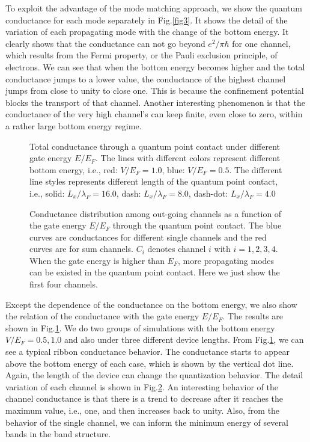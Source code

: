 \documentclass[journal]{IEEEtran}
\begin{document}
To exploit the advantage of the mode matching approach, we show the quantum conductance for each mode separately in
Fig.\ref{fig3}. It shows the detail of the variation of each propagating mode with the change of the bottom energy. It
clearly shows that the conductance can not go beyond $e^2/\pi\hbar$ for one channel, which results from the Fermi
property, or the Pauli exclusion principle, of electrons. We can see that when the bottom energy becomes higher and the
total conductance jumps to a lower value, the conductance of the highest channel jumps from close to unity to close one.
This is because the confinement potential blocks the transport of that channel. Another interesting phenomenon is that
the conductance of the very high channel's can keep finite, even close to zero, within a rather large bottom energy
regime.
\begin{figure}
    \centering
    \caption{Total conductance through a quantum point contact under different gate energy $E/E_F$. The lines with
    different colors represent different bottom energy, i.e., red: $V/E_F=1.0$, blue: $V/E_F=0.5$.  The different line
styles represents different length of the quantum point contact, i.e., solid: $L_x/\lambda_F=16.0$, dash:
$L_x/\lambda_F=8.0$, dash-dot: $L_x/\lambda_F=4.0$} \label{fig4}
\end{figure}
\begin{figure}
    \centering
    \caption{Conductance distribution among out-going channels as a function of the gate energy $E/E_F$ through the
    quantum point contact. The blue curves are conductances for different single channels and the red curves are for sum
channels. $C_i$ denotes channel $i$ with $i=1,2,3,4$. When the gate energy is higher than $E_F$, more propagating modes
can be existed in the quantum point contact. Here we just show the first four channels.}
    \label{fig5}
\end{figure}

Except the dependence of the conductance on the bottom energy, we also show the relation of the conductance with the
gate energy $E/E_F$. The results are shown in Fig.\ref{fig4}. We do two groups of simulations with the bottom energy
$V/E_F=0.5, 1.0$ and also under three different device lengths. From Fig.\ref{fig4}, we can see a typical ribbon
conductance behavior. The conductance starts to appear above the bottom energy of each case, which is shown by the
vertical dot line. Again, the length of the device can change the quantization behavior. The detail variation of each
channel is shown in Fig.\ref{fig5}. An interesting behavior of the channel conductance is that there is a trend to
decrease after it reaches the maximum value, i.e., one, and then increases back to unity. Also, from the behavior of the
single channel, we can inform the minimum energy of several bands in the band structure.
\end{document}
